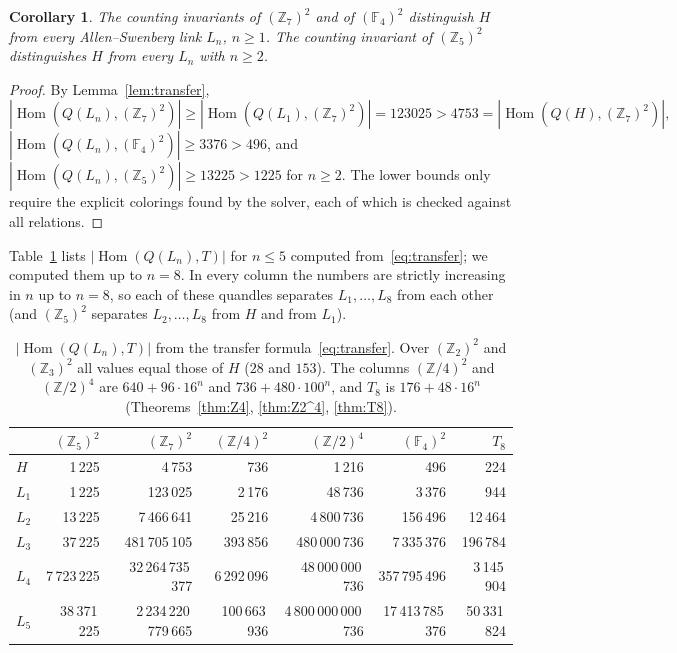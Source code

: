 \documentclass[11pt]{article}
\newtheorem{corollary}[theorem]{Corollary}
\theoremstyle{definition}
\newcommand{\Z}{\mathbb{Z}}
\newcommand{\F}{\mathbb{F}}
\newcommand{\Hom}{\operatorname{Hom}}
\begin{document}
\begin{corollary}\label{cor:Z7}
The counting invariants of $(\Z_7)^2$ and of $(\F_4)^2$ distinguish $H$ from every Allen--Swenberg link
$L_n$, $n\ge1$. The counting invariant of $(\Z_5)^2$ distinguishes $H$ from every $L_n$ with $n\ge2$.
\end{corollary}

\begin{proof}
By Lemma~\ref{lem:transfer},
\[
|\Hom(Q(L_n),(\Z_7)^2)|\ge|\Hom(Q(L_1),(\Z_7)^2)|=123025>4753=|\Hom(Q(H),(\Z_7)^2)|,
\]
$|\Hom(Q(L_n),(\F_4)^2)|\ge3376>496$, and $|\Hom(Q(L_n),(\Z_5)^2)|\ge13225>1225$ for $n\ge2$. The lower
bounds only require the explicit colorings found by the solver, each of which is checked against all
relations.
\end{proof}

Table~\ref{tab:family} lists $|\Hom(Q(L_n),T)|$ for $n\le5$ computed from~\eqref{eq:transfer}; we
computed them up to $n=8$. In every column the numbers are strictly increasing in $n$ up to $n=8$, so each
of these quandles separates $L_1,\dots,L_8$ from each other (and $(\Z_5)^2$ separates $L_2,\dots,L_8$ from $H$
and from $L_1$).

\begin{table}[h]
\centering\scriptsize
\begin{tabular}{@{}lrrrrrr@{}}
\toprule
 & $(\Z_5)^2$ & $(\Z_7)^2$ & $(\Z/4)^2$ & $(\Z/2)^4$ & $(\F_4)^2$ & $T_8$\\
\midrule
$H$ & 1\,225 & 4\,753 & 736 & 1\,216 & 496 & 224 \\ \midrule
$L_1$ & 1\,225 & 123\,025 & 2\,176 & 48\,736 & 3\,376 & 944 \\
$L_2$ & 13\,225 & 7\,466\,641 & 25\,216 & 4\,800\,736 & 156\,496 & 12\,464 \\
$L_3$ & 37\,225 & 481\,705\,105 & 393\,856 & 480\,000\,736 & 7\,335\,376 & 196\,784 \\
$L_4$ & 7\,723\,225 & 32\,264\,735\,377 & 6\,292\,096 & 48\,000\,000\,736 & 357\,795\,496 & 3\,145\,904 \\
$L_5$ & 38\,371\,225 & 2\,234\,220\,779\,665 & 100\,663\,936 & 4\,800\,000\,000\,736 & 17\,413\,785\,376 & 50\,331\,824 \\
\bottomrule
\end{tabular}
\caption{$|\Hom(Q(L_n),T)|$ from the transfer formula~\eqref{eq:transfer}. Over $(\Z_2)^2$ and $(\Z_3)^2$
all values equal those of $H$ ($28$ and $153$). The columns $(\Z/4)^2$ and $(\Z/2)^4$ are
$640+96\cdot16^n$ and $736+480\cdot100^n$, and $T_8$ is $176+48\cdot16^n$ (Theorems~\ref{thm:Z4},
\ref{thm:Z2^4}, \ref{thm:T8}).}
\label{tab:family}
\end{table}
\end{document}
